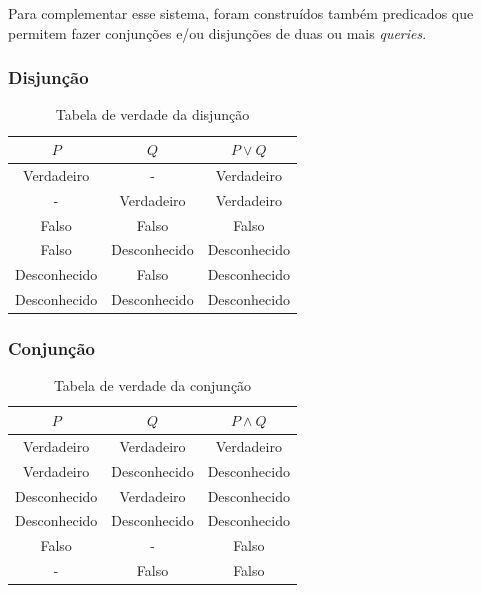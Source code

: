 \documentclass[a4paper, 11pt]{article}
\begin{document}
Para complementar esse sistema, foram
construídos também predicados que permitem fazer conjunções e/ou disjunções de duas ou mais 
\textit{queries}.

\subsubsection*{Disjunção}

\begin{table}[H]
    \centering
    \begin{tabular}{|c|c|c|}
    \hline
    $P$          & $Q$          & $P \lor Q$                \\ \hline
    Verdadeiro   & -            & Verdadeiro                \\ \hline
    -            & Verdadeiro   & Verdadeiro                \\ \hline
    Falso        & Falso        & Falso                     \\ \hline
    Falso        & Desconhecido & Desconhecido              \\ \hline
    Desconhecido & Falso        & Desconhecido              \\ \hline
    Desconhecido & Desconhecido & Desconhecido              \\ \hline
    \end{tabular}
    \caption{Tabela de verdade da disjunção}
\end{table}

\subsubsection*{Conjunção}

\begin{table}[H]
    \centering
    \begin{tabular}{|c|c|c|}
    \hline
    $P$          & $Q$          & $P \land Q$               \\ \hline
    Verdadeiro   & Verdadeiro   & Verdadeiro                \\ \hline
    Verdadeiro   & Desconhecido & Desconhecido              \\ \hline
    Desconhecido & Verdadeiro   & Desconhecido              \\ \hline
    Desconhecido & Desconhecido & Desconhecido              \\ \hline
    Falso        & -            & Falso                     \\ \hline
    -            & Falso        & Falso                     \\ \hline
    \end{tabular}
    \caption{Tabela de verdade da conjunção}
\end{table}
\end{document}
